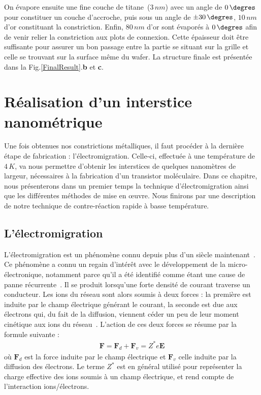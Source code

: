 On évapore ensuite une fine couche de titane~(3$\, nm$) avec un angle de $0\,\degres$ pour constituer un couche d'accroche, puis sous un angle de $\pm30\,\degres$, $10\, nm$ d'or  constituant la constriction. Enfin, $80\,nm$ d'or sont évaporés à $0\,\degres$ afin de venir relier la constriction aux plots de connexion. Cette épaisseur doit être suffisante pour assurer un bon passage entre la partie se situant sur la grille et celle se trouvant sur la surface même du wafer. La structure finale est présentée dans la Fig.\ref{FinalResult}.\textbf{b} et \textbf{c}.


\section{Réalisation d'un interstice nanométrique}
Une fois obtenues nos constrictions métalliques, il faut procéder à la dernière étape de fabrication : l'électromigration. Celle-ci, effectuée à une température de $4\,K$, va nous permettre d'obtenir les interstices de quelques nanomètres de largeur, nécessaires à la fabrication d'un transistor moléculaire. Dans ce chapitre, nous présenterons dans un premier temps la technique d'électromigration ainsi que les différentes méthodes de mise en œuvre. Nous finirons par une description de notre technique de contre-réaction rapide à basse température.

\subsection{L'électromigration}
L'électromigration est un phénomène connu depuis plus d'un siècle maintenant~\cite{Gerardin1861}. Ce phénomène a connu un regain d'intérêt avec le développement de la micro-électronique, notamment parce qu'il a été identifié comme étant une cause de panne récurrente~\cite{Blech1967,Black1969}.
Il se produit lorsqu'une forte densité de courant traverse un conducteur. Les ions du réseau sont alors soumis à deux forces : la première est induite par le champ électrique générant le courant, la seconde est due aux électrons qui, du fait de la diffusion, viennent céder un peu de leur moment cinétique aux ions du réseau~\cite{Ho1989}. L'action de ces deux forces se résume par la formule suivante :
\begin{eqnarray}
\textbf{F} = \textbf{F}_d + \textbf{F}_v = Z^*e\textbf{E} \nonumber
\end{eqnarray}
où $\textbf{F}_d$ est la force induite par le champ électrique et $\textbf{F}_v$ celle induite par la diffusion des électrons. Le terme $Z^*$ est en général utilisé pour représenter la charge effective des ions soumis à un champ électrique, et rend compte de l'interaction ions/électrons.

